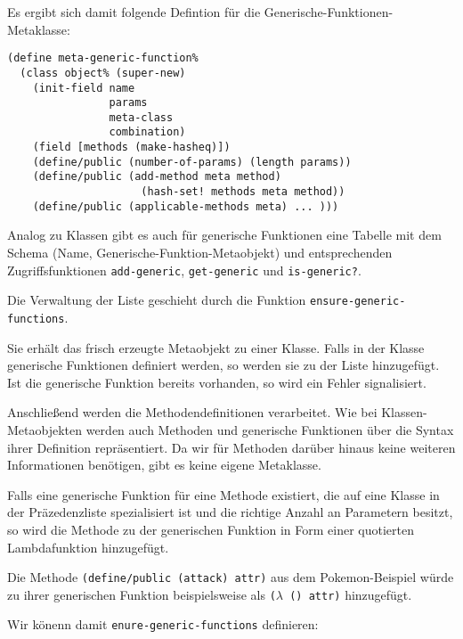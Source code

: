 Es ergibt sich damit folgende Defintion für die Generische-Funktionen-Metaklasse:

\begin{lstlisting}
(define meta-generic-function%
  (class object% (super-new)
    (init-field name
                params
                meta-class
                combination) 
    (field [methods (make-hasheq)]) 
    (define/public (number-of-params) (length params))
    (define/public (add-method meta method) 
                     (hash-set! methods meta method))
    (define/public (applicable-methods meta) ... )))
\end{lstlisting}

Analog zu Klassen gibt es auch für generische Funktionen eine Tabelle mit dem Schema (Name, Generische-Funktion-Metaobjekt) und entsprechenden Zugriffsfunktionen \texttt{add-generic}, \texttt{get-generic} und \texttt{is-generic?}.

Die Verwaltung der Liste geschieht durch die Funktion \texttt{ensure-generic-functions}. 

Sie erhält das frisch erzeugte Metaobjekt zu einer Klasse. Falls in der Klasse generische Funktionen definiert werden, so werden sie zu der Liste hinzugefügt. Ist die generische Funktion bereits vorhanden, so wird ein Fehler signalisiert.

Anschließend werden die Methodendefinitionen verarbeitet. Wie bei Klassen-Metaobjekten werden auch Methoden und generische Funktionen über die Syntax ihrer Definition repräsentiert. Da wir für Methoden darüber hinaus keine weiteren Informationen benötigen, gibt es keine eigene Metaklasse. 

Falls eine generische Funktion für eine Methode existiert, die auf eine Klasse in der Präzedenzliste spezialisiert ist und die richtige Anzahl an Parametern besitzt, so wird die Methode zu der generischen Funktion in Form einer quotierten Lambdafunktion hinzugefügt. 

Die Methode \texttt{(define/public (attack) {\textquotesingle}attr)} aus dem Pokemon-Beispiel würde zu ihrer generischen Funktion beispielsweise als \texttt{($\lambda$ () {\textquotesingle}attr)} hinzugefügt. 

Wir könenn damit \texttt{enure-generic-functions} definieren:

